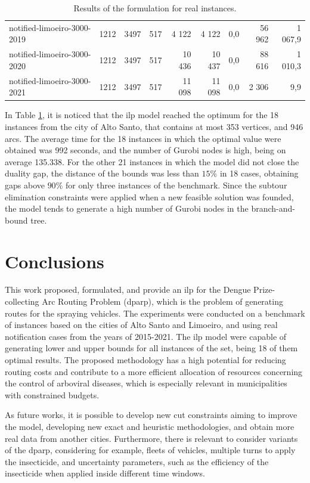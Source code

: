\documentclass[a4paper,11pt]{article}
\begin{document}
\begin{table}[!ht]
{\begin{tabular}{lrrrrrrrr}
\rowcolor[HTML]{9B9B9B} 
notified-limoeiro-3000-2019   & 1212 & 3497 & 517 & 4 122  & 4 122  & 0,0  & 56 962  & 1 067,9                     \\
\rowcolor[HTML]{9B9B9B} 
notified-limoeiro-3000-2020   & 1212 & 3497 & 517 & 10 436 & 10 437 & 0,0  & 88 616  & 1 010,3                     \\
\rowcolor[HTML]{9B9B9B} 
notified-limoeiro-3000-2021   & 1212 & 3497 & 517 & 11 098 & 11 098 & 0,0  & 2 306   & 9,9                         \\ \hline
\end{tabular}%
}
\caption{Results of the formulation for real instances.}
\label{tab:model-results}
\end{table}

In Table \ref{tab:model-results}, it is noticed that the \gls{ilp} model reached
the optimum for the  18 instances from the city of Alto  Santo, that contains at
most 353 vertices, and 946 arcs. The average time for the 18 instances in which
the optimal value were obtained was 992  seconds, and the number of Gurobi nodes
is high, being on average 135.338. For the other 21 instances in which the model
did not close the  duality gap, the distance of the bounds  was less than $15\%$
in  18 cases,  obtaining  gaps above  $90\%$  for only  three  instances of  the
benchmark. Since  the subtour  elimination constraints were  applied when  a new
feasible solution  was founded,  the model  tends to generate  a high  number of
Gurobi nodes in the branch-and-bound tree.

\section{Conclusions} \label{sec:conclusions}

This  work  proposed,  formulated,  and  provide an  \gls{ilp}  for  the  Dengue
Prize-collecting  Arc Routing  Problem (\gls{dparp}),  which is  the problem  of
generating routes for the spraying vehicles. The experiments were conducted on a
benchmark of instances based on the cities of Alto Santo and Limoeiro, and using
real notification  cases from the years  of 2015-2021. The \gls{ilp}  model were
capable of generating lower and upper bounds for all instances of the set, being
18 of  them optimal results. The  proposed methodology has a  high potential for
reducing  routing  costs  and  contribute  to a  more  efficient  allocation  of
resources  concerning the  control of  arboviral diseases,  which is  especially
relevant in municipalities with constrained budgets.

As future works, it is possible to develop new cut constraints aiming to improve
the model,  developing new  exact and heuristic  methodologies, and  obtain more
real  data from  another  cities.  Furthermore, there  is  relevant to  consider
variants  of  the \gls{dparp},  considering  for  example, fleets  of  vehicles,
multiple turns to apply the insecticide, and uncertainty parameters, such as the
efficiency of the insecticide when applied inside different time windows.

\newpage
~\\


\end{document}

